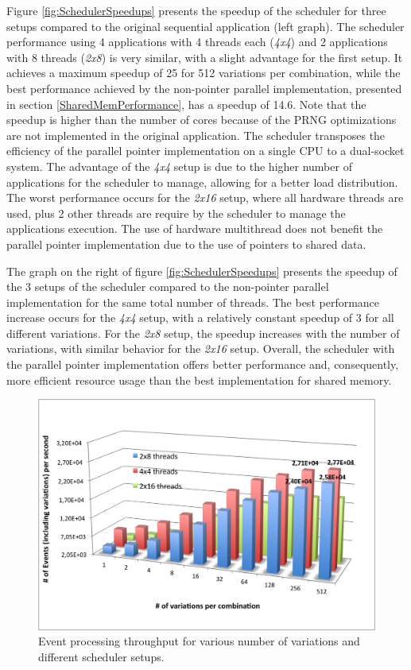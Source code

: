 Figure \ref{fig:SchedulerSpeedups} presents the speedup of the scheduler for three setups compared to the original sequential application (left graph). The scheduler performance using 4 applications with 4 threads each (\textit{4x4}) and 2 applications with 8 threads (\textit{2x8}) is very similar, with a slight advantage for the first setup. It achieves a maximum speedup of 25 for 512 variations per combination, while the best performance achieved by the non-pointer parallel implementation, presented in section \ref{SharedMemPerformance}, has a speedup of 14.6. Note that the speedup is higher than the number of cores because of the PRNG optimizations are not implemented in the original application. The scheduler transposes the efficiency of the parallel pointer implementation on a single CPU to a dual-socket system. The advantage of the \textit{4x4} setup is due to the higher number of applications for the scheduler to manage, allowing for a better load distribution. The worst performance occurs for the \textit{2x16} setup, where all hardware threads are used, plus 2 other threads are require by the scheduler to manage the applications execution. The use of hardware multithread does not benefit the parallel pointer implementation due to the use of pointers to shared data.

The graph on the right of figure \ref{fig:SchedulerSpeedups} presents the speedup of the 3 setups of the scheduler compared to the non-pointer parallel implementation for the same total number of threads. The best performance increase occurs for the \textit{4x4} setup, with a relatively constant speedup of 3 for all different variations. For the \textit{2x8} setup, the speedup increases with the number of variations, with similar behavior for the \textit{2x16} setup. Overall, the scheduler with the parallel pointer implementation offers better performance and, consequently, more efficient resource usage than the best implementation for shared memory.

\begin{figure}[!htp]
	\begin{center}
		\includegraphics[scale=0.7]{../../common/graphs/throughput_scheduler.png}
		\caption{Event processing throughput for various number of variations and different scheduler setups.}
		\label{fig:SchedulerThroughput}
	\end{center}
\end{figure}

